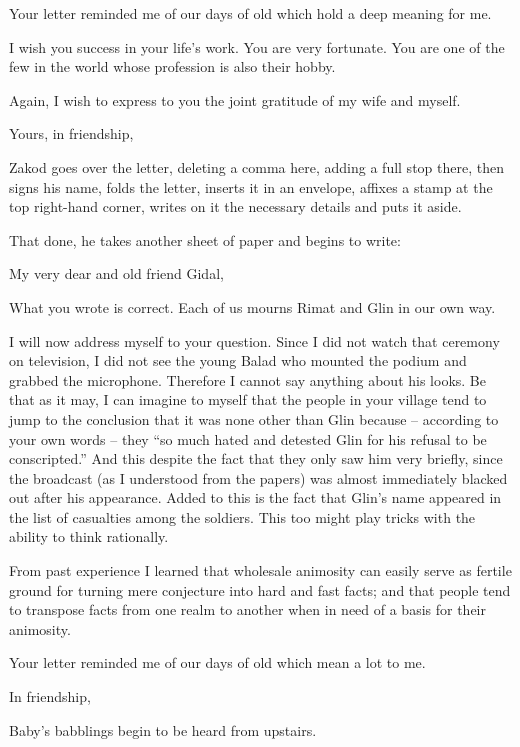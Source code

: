 \documentclass[twoside,11pt]{book}
\begin{document}
Your letter reminded me of our days of old which hold a deep meaning for me.

I wish you success in your life's work. You are very fortunate. You are one of the few in the world whose profession is
also their hobby.

Again, I wish to express to you the joint gratitude of my wife and myself.

Yours, in friendship,



Zakod goes over the letter, deleting a comma here, adding a full stop there, then signs his name, folds the letter,
inserts it in an envelope, affixes a stamp at the top right-hand corner, writes on it the necessary details and puts it
aside.

That done, he takes another sheet of paper and begins to write:



My very dear and old friend Gidal,

What you wrote is correct. Each of us mourns Rimat and Glin in our own way.

I will now address myself to your question.  Since I did not watch that ceremony on television, I did not see the young
Balad who mounted the podium and grabbed the microphone. Therefore I cannot say anything about his looks. Be that as it
may, I can imagine to myself that the people in your village tend to jump to the conclusion that it was none other than
Glin because -- according to your own words -- they ``so much hated and detested Glin for his refusal to
be conscripted.'' And this despite the fact that they only saw him very briefly, since the broadcast (as I
understood from the papers) was almost immediately blacked out after his appearance. Added to this is the fact that
Glin's name appeared in the list of casualties among the soldiers. This too might play tricks with the ability to think
rationally.

From past experience I learned that wholesale animosity can easily serve as fertile ground for turning mere conjecture
into hard and fast facts; and that people tend to transpose facts from one realm to another when in need of a basis
for their animosity.

Your letter reminded me of our days of old which mean a lot to me.



In friendship,



Baby's babblings begin to be heard from upstairs.
\end{document}

